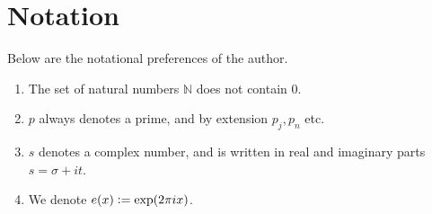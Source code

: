 \section*{Notation}
Below are the notational preferences of the author.
\begin{enumerate}
    \item The set of natural numbers $\mathbb{N}$ does not contain $0$.
    \item $p$ always denotes a prime, and by extension $p_j,p_n$ etc.
    \item $s$ denotes a complex number, and is written in real and imaginary parts $s=\sigma + it$.
    \item We denote $e(x)\mathrel{\mathop:}= \exp(2\pi i x)$.
\end{enumerate}